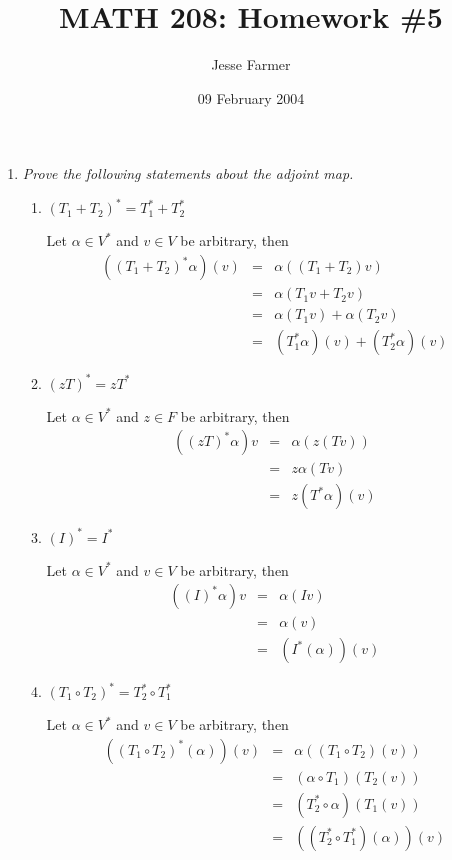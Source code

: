 \documentclass[11pt]{article}
\title{MATH 208: Homework \#5}
\author{Jesse Farmer}
\date{09 February 2004}
\begin{document}
\maketitle
\begin{enumerate}

\item \emph{Prove the following statements about the adjoint map.}
\begin{enumerate}
\item \emph{$(T_1 + T_2)^{\ast} = T_1^{\ast} + T_2^{\ast}$}

Let $\alpha \in V^{\ast}$ and $v \in V$ be arbitrary, then
\begin{eqnarray*}
((T_1 + T_2)^{\ast}\alpha)(v) &=& \alpha((T_1 + T_2)v) \\
&=& \alpha(T_1v + T_2v) \\
&=& \alpha(T_1v) + \alpha(T_2v) \\
&=& (T_1^{\ast}\alpha)(v) + (T_2^{\ast}\alpha)(v)
\end{eqnarray*}

\item \emph{$(zT)^{\ast} = zT^{\ast}$}

Let $\alpha \in V^{\ast}$ and $z \in F$ be arbitrary, then
\begin{eqnarray*}
((zT)^{\ast}\alpha)v &=& \alpha(z(Tv)) \\
&=& z \alpha(Tv) \\
&=& z (T^{\ast}\alpha)(v)
\end{eqnarray*}

\item \emph{$(I)^{\ast} = I^{\ast}$}

Let $\alpha \in V^{\ast}$ and $v \in V$ be arbitrary, then
\begin{eqnarray*}
((I)^{\ast} \alpha)v &=& \alpha(Iv) \\
&=& \alpha(v) \\
&=& (I^{\ast}(\alpha))(v)
\end{eqnarray*}

\item \emph{$(T_1 \circ T_2)^{\ast} = T_2^{\ast} \circ T_1^{\ast}$}

Let $\alpha \in V^{\ast}$ and $v \in V$ be arbitrary, then
\begin{eqnarray*}
((T_1 \circ T_2)^{\ast}(\alpha))(v) &=& \alpha((T_1 \circ T_2)(v)) \\
&=& (\alpha \circ T_1)(T_2(v)) \\
&=& (T_2^{\ast} \circ \alpha)(T_1 (v)) \\
&=& ((T_2^{\ast} \circ T_1^{\ast})(\alpha))(v)
\end{eqnarray*}
\end{enumerate}


\end{enumerate}
\end{document}
